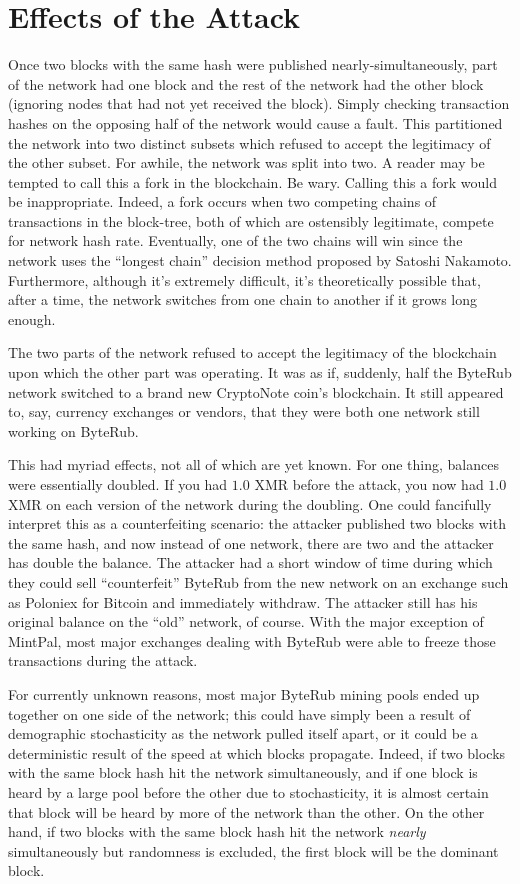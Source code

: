 \documentclass{mrl}
\begin{document}
\section{Effects of the Attack}

Once two blocks with the same hash were published nearly-simultaneously, part of the network had one block and the rest of the network had the other block (ignoring nodes that had not yet received the block). Simply checking transaction hashes on the opposing half of the network would cause a fault. This partitioned the network into two distinct subsets which refused to accept the legitimacy of the other subset. For awhile, the network was split into two. A reader may be tempted to call this a fork in the blockchain. Be wary. Calling this a fork would be inappropriate. Indeed, a fork occurs when two competing chains of transactions in the block-tree, both of which are ostensibly legitimate, compete for network hash rate. Eventually, one of the two chains will win since the network uses the ``longest chain'' decision method proposed by Satoshi Nakamoto. Furthermore, although it's extremely difficult, it's theoretically possible that, after a time, the network switches from one chain to another if it grows long enough.

The two parts of the network refused to accept the legitimacy of the blockchain upon which the other part was operating. It was as if, suddenly, half the ByteRub network switched to a brand new CryptoNote coin's blockchain. It still appeared to, say, currency exchanges or vendors, that they were both one network still working on ByteRub.

This had myriad effects, not all of which are yet known. For one thing, balances were essentially doubled. If you had $1.0$ XMR before the attack, you now had $1.0$ XMR on each version of the network during the doubling. One could fancifully interpret this as a counterfeiting scenario: the attacker published two blocks with the same hash, and now instead of one network, there are two and the attacker has double the balance. The attacker had a short window of time during which they could sell ``counterfeit'' ByteRub from the new network on an exchange such as Poloniex for Bitcoin and immediately withdraw. The attacker still has his original balance on the ``old'' network, of course. With the major exception of MintPal, most major exchanges dealing with ByteRub were able to freeze those transactions during the attack.

For currently unknown reasons, most major ByteRub mining pools ended up together on one side of the network; this could have simply been a result of demographic stochasticity as the network pulled itself apart, or it could be a deterministic result of the speed at which blocks propagate. Indeed, if two blocks with the same block hash hit the network simultaneously, and if one block is heard by a large pool before the other due to stochasticity, it is almost certain that block will be heard by more of the network than the other.  On the other hand, if two blocks with the same block hash hit the network \emph{nearly} simultaneously but randomness is excluded, the first block will be the dominant block. 
\end{document}
